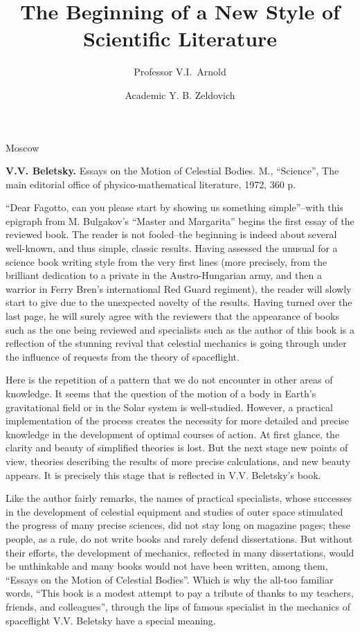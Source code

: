 \documentclass[12pt]{amsart}
\title{The Beginning of a New Style of Scientific Literature}
\author{Professor V.I.~Arnold\and Academic Y. B. Zeldovich}
\begin{document}
\maketitle
\centerline{Moscow}
\vspace{2em}
\noindent\textbf{V.V. Beletsky.} Essays on the Motion of Celestial Bodies.
M., ``Science'', The main editorial office of physico-mathematical literature,
1972, 360 p.

``Dear Fagotto, can you please start by showing us something simple''--with this
epigraph from M. Bulgakov's ``Master and Margarita'' begins the first essay of
the reviewed book.
The reader is not fooled--the beginning is indeed about several well-known, and
thus simple, classic results.
Having assessed the unusual for a science book writing style from the very first
lines (more precisely, from the brilliant dedication to a private in the
Austro-Hungarian army, and then a warrior in Ferry Bren's international Red
Guard regiment), the reader will slowly start to give due to the unexpected
novelty of the results.
Having turned over the last page, he will surely agree with the reviewers that
the appearance of books such as the one being reviewed and specialists such as
the author of this book is a reflection of the stunning revival that celestial
mechanics is going through under the influence of requests from the theory of
spaceflight.

Here is the repetition of a pattern that we do not encounter in other areas of
knowledge.
It seems that the question of the motion of a body in Earth's gravitational
field or in the Solar system is well-studied.
However, a practical implementation of the process creates the necessity for
more detailed and precise knowledge in the development of optimal courses of
action.
At first glance, the clarity and beauty of simplified theories is lost.
But the next stage new points of view, theories describing the results of more
precise calculations, and new beauty appears.
It is precisely this stage that is reflected in V.V. Beletsky's book.

Like the author fairly remarks, the names of practical specialists, whose
successes in the development of celestial equipment and studies of outer space
stimulated the progress of many precise sciences, did not stay long on magazine
pages; these people, as a rule, do not write books and rarely defend
dissertations.
But without their efforts, the development of mechanics, reflected in many
dissertations, would be unthinkable and many books would not have been written,
among them, ``Essays on the Motion of Celestial Bodies''.
Which is why the all-too familiar words, ``This book is a modest attempt to pay
a tribute of thanks to my teachers, friends, and colleagues'', through the lips
of famous specialist in the mechanics of spaceflight V.V. Beletsky have a
special meaning.
\end{document}
